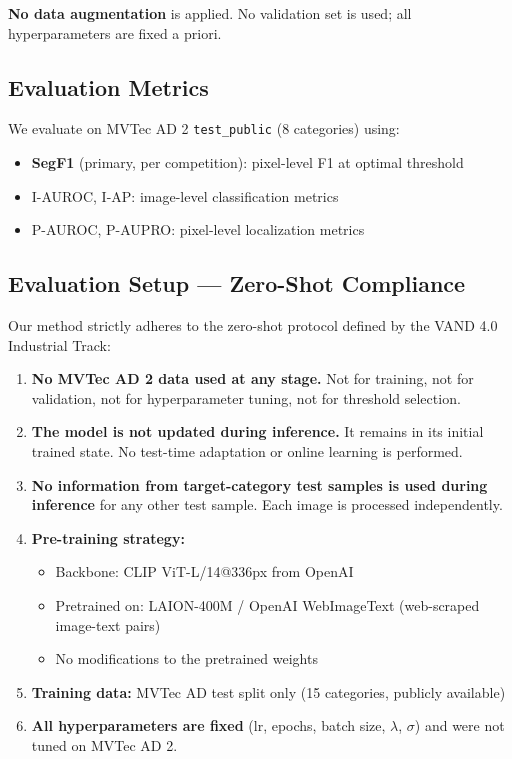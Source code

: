 \documentclass[10pt,twocolumn,letterpaper]{article}
\begin{document}
\textbf{No data augmentation} is applied. No validation set is used; all hyperparameters are fixed a priori.

\subsection{Evaluation Metrics}

We evaluate on MVTec AD 2 \texttt{test\_public} (8 categories) using:
\begin{itemize}[nosep]
  \item \textbf{SegF1} (primary, per competition): pixel-level F1 at optimal threshold
  \item I-AUROC, I-AP: image-level classification metrics
  \item P-AUROC, P-AUPRO: pixel-level localization metrics
\end{itemize}

\subsection{Evaluation Setup --- Zero-Shot Compliance}
\label{sec:zeroshot}

Our method strictly adheres to the zero-shot protocol defined by the VAND 4.0 Industrial Track:

\begin{enumerate}[nosep]
  \item \textbf{No MVTec AD 2 data used at any stage.} Not for training, not for validation, not for hyperparameter tuning, not for threshold selection.
  \item \textbf{The model is not updated during inference.} It remains in its initial trained state. No test-time adaptation or online learning is performed.
  \item \textbf{No information from target-category test samples is used during inference} for any other test sample. Each image is processed independently.
  \item \textbf{Pre-training strategy:}
  \begin{itemize}[nosep]
    \item Backbone: CLIP ViT-L/14@336px from OpenAI
    \item Pretrained on: LAION-400M / OpenAI WebImageText (web-scraped image-text pairs)
    \item No modifications to the pretrained weights
  \end{itemize}
  \item \textbf{Training data:} MVTec AD test split only (15 categories, publicly available)
  \item \textbf{All hyperparameters are fixed} (lr, epochs, batch size, $\lambda$, $\sigma$) and were not tuned on MVTec AD 2.
\end{enumerate}
\end{document}
